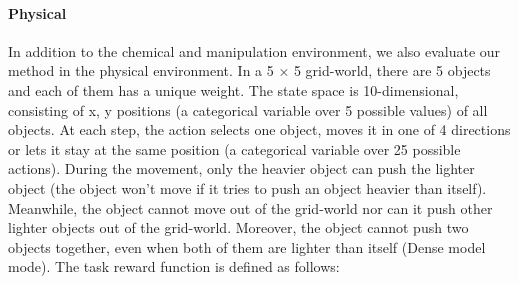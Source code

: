 

\paragraph{Physical}
In addition to the chemical and manipulation environment, we also evaluate our method in the physical environment. In a 5 × 5 grid-world, there are 5 objects and each of them has a unique weight. The state space is 10-dimensional, consisting of x, y positions (a categorical variable over 5 possible values) of all objects. At each step, the action selects one object, moves it in one of 4 directions or lets it stay at the same position (a categorical variable over 25 possible actions). During the movement, only the heavier object can push the lighter object (the object won’t move if it tries to push an object heavier than itself). Meanwhile, the object cannot move out of the grid-world nor can it push other lighter objects out of the grid-world. Moreover, the object cannot push two objects together, even when both of them are lighter than itself (Dense model mode). The task reward function is defined as follows:

